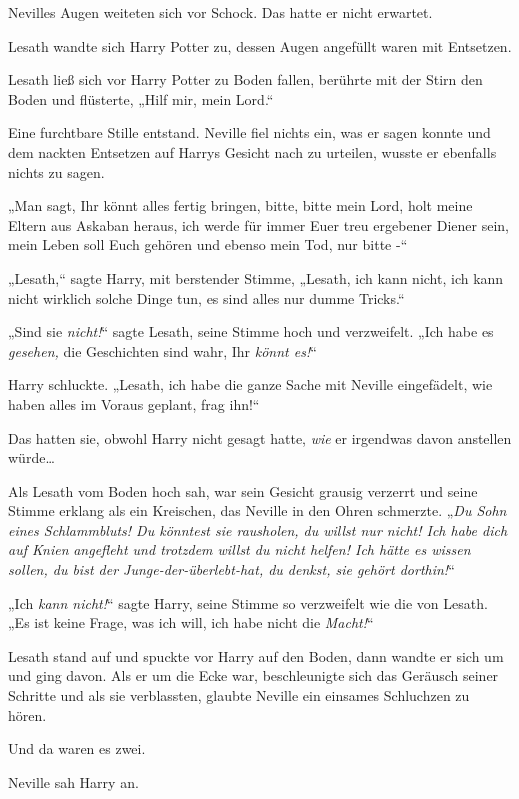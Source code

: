 {Nevilles Augen weiteten sich vor Schock. Das hatte er nicht erwartet.

Lesath wandte sich Harry Potter zu, dessen Augen angefüllt waren mit Entsetzen.

Lesath ließ sich vor Harry Potter zu Boden fallen, berührte mit der Stirn den Boden und flüsterte, „Hilf mir, mein Lord.“

Eine furchtbare Stille entstand. Neville fiel nichts ein, was er sagen konnte und dem nackten Entsetzen auf Harrys Gesicht nach zu urteilen, wusste er ebenfalls nichts zu sagen.

„Man sagt, Ihr könnt alles fertig bringen, bitte, bitte mein Lord, holt meine Eltern aus Askaban heraus, ich werde für immer Euer treu ergebener Diener sein, mein Leben soll Euch gehören und ebenso mein Tod, nur bitte -“

„Lesath,“ sagte Harry, mit berstender Stimme, „Lesath, ich kann nicht, ich kann nicht wirklich solche Dinge tun, es sind alles nur dumme Tricks.“

„Sind sie \emph{nicht!}“ sagte Lesath, seine Stimme hoch und verzweifelt. „Ich habe es \emph{gesehen,} die Geschichten sind wahr, Ihr \emph{könnt es!}“

Harry schluckte. „Lesath, ich habe die ganze Sache mit Neville eingefädelt, wie haben alles im Voraus geplant, frag ihn!“

Das hatten sie, obwohl Harry nicht gesagt hatte, \emph{wie} er irgendwas davon anstellen würde…

Als Lesath vom Boden hoch sah, war sein Gesicht grausig verzerrt und seine Stimme erklang als ein Kreischen, das Neville in den Ohren schmerzte. „\emph{Du Sohn eines Schlammbluts! Du könntest sie rausholen, du willst nur nicht! Ich habe dich} \emph{auf Knien} \emph{angefleht und trotzdem willst du nicht helfen! Ich hätte es wissen sollen, du bist der Junge-der-überlebt-hat, du denkst, sie gehört dorthin!}“

„Ich \emph{kann nicht!}“ sagte Harry, seine Stimme so verzweifelt wie die von Lesath. „Es ist keine Frage, was ich will, ich habe nicht die \emph{Macht!}“

Lesath stand auf und spuckte vor Harry auf den Boden, dann wandte er sich um und ging davon. Als er um die Ecke war, beschleunigte sich das Geräusch seiner Schritte und als sie verblassten, glaubte Neville ein einsames Schluchzen zu hören.

Und da waren es zwei.

Neville sah Harry an.

}
